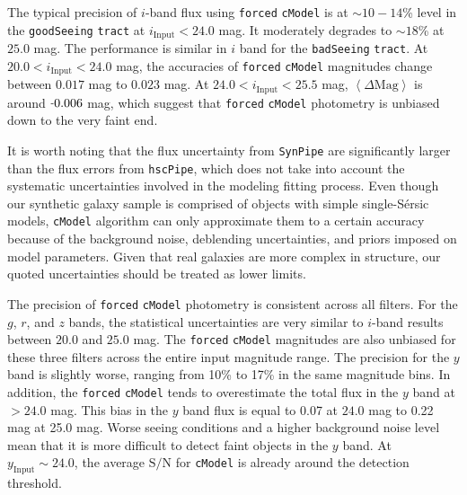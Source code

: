 \documentclass[useamsfonts]{pasj01}
\def\ser{{S\'{e}rsic\ }}
\def\hscpipe{\texttt{hscPipe}}
\def\synpipe{\texttt{SynPipe}}
\def\cmodel{\texttt{cModel}}
\def\forced{\texttt{forced}}
\def\tract{\texttt{tract}}
\def\s2n{{$\mathrm{S}/\mathrm{N}$}}
\newcommand{\plus}{\raisebox{.4\height}{\scalebox{.6}{+}}}
\newcommand{\minus}{\raisebox{.4\height}{\scalebox{.8}{-}}}
\newcommand{\mmag}{$\left<{\Delta\mathrm{Mag}}\right>$}
\begin{document}
    The typical precision of $i$-band flux using \forced{} \cmodel{} is at 
    ${\sim}10-14$\% level in the \texttt{goodSeeing} \tract{} at 
    $i_{\mathrm{Input}}<24.0$ mag. 
    It moderately degrades to ${\sim}18$\% at $25.0$ mag. 
    The performance is similar in $i$ band for the \texttt{badSeeing} \tract{}. 
    At $20.0 < i_{\mathrm{Input}} < 24.0$ mag, the accuracies of \forced{} \cmodel{}
    magnitudes change between \plus{}$0.017$ mag to \minus{}$0.023$ mag. 
    At $24.0 < i_{\mathrm{Input}} < 25.5$ mag, \mmag{} is around $\minus0.006$ mag,
    which suggest that \forced{} \cmodel{} photometry is unbiased down to the very 
    faint end.
    
    It is worth noting that the flux uncertainty from \synpipe{} are significantly 
    larger than the flux errors from \hscpipe{}, which does not take into account the 
    systematic uncertainties involved in the modeling fitting process. 
    Even though our synthetic galaxy sample is comprised of objects with simple 
    single-\ser{} models, \cmodel{} algorithm can only approximate them to a certain 
    accuracy because of the background noise, deblending uncertainties, and priors 
    imposed on model parameters. 
    Given that real galaxies are more complex in structure, our quoted uncertainties 
    should be treated as lower limits.


    The precision of \forced{} \cmodel{} photometry is consistent across all filters.
    For the $g$, $r$, and $z$ bands, the statistical uncertainties are very similar to
    $i$-band results between $20.0$ and $25.0$ mag.
    The \forced{} \cmodel{} magnitudes are also unbiased for these three filters
    across the entire input magnitude range.
    The precision for the $y$ band is slightly worse, ranging from 10\% to 17\% in the
    same magnitude bins.
    In addition, the \forced{} \cmodel{} tends to overestimate the total flux in 
    the $y$ band at $>24.0$ mag. 
    This bias in the $y$ band flux is equal to \minus{}0.07 at $24.0$ mag to 
    \minus{}0.22 mag at 25.0 mag. 
    Worse seeing conditions and a higher background noise level mean that it is more
    difficult to detect faint objects in the $y$ band.
    At $y_{\mathrm{Input}}{\sim}24.0$, the average \s2n{} for \cmodel{} is already
    around the detection threshold.
\end{document}
